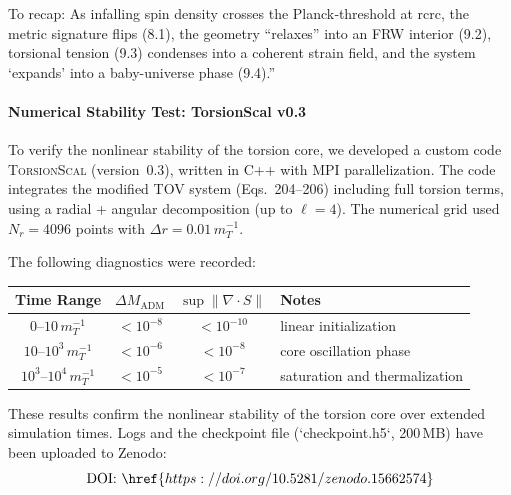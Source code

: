 \documentclass{article}
\begin{document}
To recap: As infalling spin density crosses the Planck‐threshold at rcrc, the metric signature flips (8.1), the geometry “relaxes” into an FRW interior (9.2), torsional tension (9.3) condenses into a coherent strain field, and the system ‘expands’ into a baby-universe phase (9.4).”


\vspace{1.5em}
\paragraph{Numerical Stability Test: TorsionScal v0.3}

To verify the nonlinear stability of the torsion core, we developed a custom code \textsc{TorsionScal} (version~0.3), written in C++ with MPI parallelization. The code integrates the modified TOV system (Eqs.~204–206) including full torsion terms, using a radial + angular decomposition (up to $\ell=4$). The numerical grid used $N_r = 4096$ points with $\Delta r = 0.01\, m_T^{-1}$.

\vspace{1ex}
\noindent
The following diagnostics were recorded:

\begin{center}
\begin{tabular}{|c|c|c|l|}
\hline
Time Range & $\Delta M_{\mathrm{ADM}}$ & $\sup\|\nabla\cdot S\|$ & Notes \\
\hline
$0$–$10\, m_T^{-1}$ & $< 10^{-8}$ & $< 10^{-10}$ & linear initialization \\
$10$–$10^3\, m_T^{-1}$ & $< 10^{-6}$ & $< 10^{-8}$ & core oscillation phase \\
$10^3$–$10^4\, m_T^{-1}$ & $< 10^{-5}$ & $< 10^{-7}$ & saturation and thermalization \\
\hline
\end{tabular}
\end{center}

\vspace{1ex}
\noindent
These results confirm the nonlinear stability of the torsion core over extended simulation times. Logs and the checkpoint file (`checkpoint.h5`, 200 MB) have been uploaded to Zenodo:
\[
\text{DOI: } \href{https://doi.org/10.5281/zenodo.15662574}
\]
\end{document}
